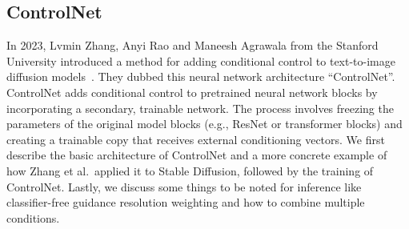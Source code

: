 \subsection{ControlNet}
In 2023, Lvmin Zhang, Anyi Rao and Maneesh Agrawala from the Stanford University introduced a method for adding conditional control to text-to-image diffusion models~\cite{zhang2023addingconditionalcontroltexttoimage}. They dubbed this neural network architecture ``ControlNet''. ControlNet adds conditional control to pretrained neural network blocks by incorporating a secondary, trainable network. The process involves freezing the parameters of the original model blocks (e.g., ResNet or transformer blocks) and creating a trainable copy that receives external conditioning vectors. We first describe the basic architecture of ControlNet and a more concrete example of how Zhang et al.\ applied it to Stable Diffusion, followed by the training of ControlNet. Lastly, we discuss some things to be noted for inference like classifier-free guidance resolution weighting and how to combine multiple conditions. 

